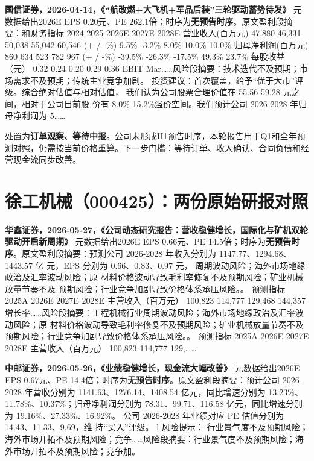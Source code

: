 \textbf{国信证券，2026-04-14，《“航改燃+大飞机+军品后装”三轮驱动蓄势待发》}
元数据给出2026E EPS 0.20元、PE 262.1倍；时序为\textbf{无预告时序}。原文盈利段摘要：和财务指标 2024 2025 2026E 2027E 2028E 营业收入(百万元) 47,880 46,331 50,038 55,042 60,546 (+ / -\%) 9.5\% -3.2\% 8.0\% 10.0\% 10.0\% 归母净利润(百万元) 860 634 523 782 967 (+ / -\%) -39.5\% -26.3\% -17.5\% 49.3\% 23.7\% 每股收益（元） 0.32 0.24 0.20 0.29 0.36 EBIT Mar……风险段摘要：技术迭代不及预期；市场需求不及预期；传统主业竞争加剧。 投资建议：首次覆盖，给予“优于大市”评级。综合绝对估值与相对估值， 我们认为公司股票合理价值在 55.56-59.28 元之间，相对于公司目前股 价有 8.0\%-15.2\%溢价空间。我们预计公司 2026-2028 年归母净利润为 5……

\begin{keyinsight}[AStock处理]
处置为\textbf{订单观察、等待中报}。公司未形成H1预告时序，本轮报告用于Q1和全年预测对照，仍需按当前价格重算。下一步门槛：等待订单、收入确认、合同负债和经营现金流同步改善。
\end{keyinsight}

\section{徐工机械（000425）：两份原始研报对照}

\textbf{华鑫证券，2026-05-27，《公司动态研究报告：营收稳健增长，国际化与矿机双轮驱动开启新周期》}
元数据给出2026E EPS 0.66元、PE 14.5倍；时序为\textbf{无预告时序}。原文盈利段摘要：预测公司 2026-2028 年收入分别为 1147.77、1294.68、1443.57 亿 元，EPS 分别为 0.66、0.83、0.97 元， 周期波动风险；海外市场地缘政治及汇率波动风险；原 材料价格波动导致毛利率修复不及预期风险；矿业机械放量节奏不及 预期风险；行业竞争加剧导致价格体系承压风险。。 预测指标 2025A 2026E 2027E 2028E 主营收入（百万元） 100,823 114,777 129,468 144,357 增长率……风险段摘要：工程机械行业周期波动风险；海外市场地缘政治及汇率波动风险；原 材料价格波动导致毛利率修复不及预期风险；矿业机械放量节奏不及 预期风险；行业竞争加剧导致价格体系承压风险。。 预测指标 2025A 2026E 2027E 2028E 主营收入（百万元） 100,823 114,777 129,……

\textbf{中邮证券，2026-05-26，《业绩稳健增长，现金流大幅改善》}
元数据给出2026E EPS 0.67元、PE 14.4倍；时序为\textbf{无预告时序}。原文盈利段摘要：预计公司 2026-2028 年营收分别为 1141.63、1276.14、1408.54 亿元，同比增速分别为 13.23\%、11.78\%、10.37\%；归母净利润分别为 78.31、99.71、116.58 亿元，同比增速分别为 19.16\%、27.33\%、16.92\%。 公司 2026-2028 年业绩对应 PE 估值分别为 14.43、11.33、9.69，维 持“买入”评级。 l 风险提示： 行业景气度不及预期风险；海外市场开拓不及预期风险；竞争……风险段摘要：行业景气度不及预期风险；海外市场开拓不及预期风险；竞争加。

